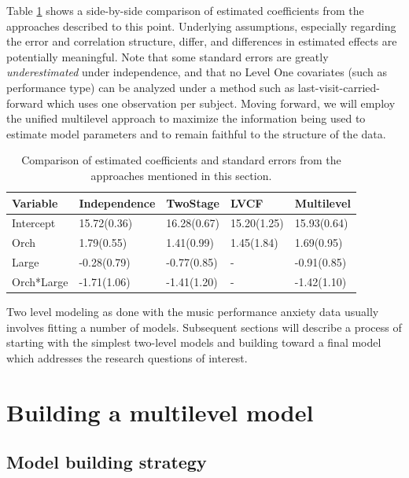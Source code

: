\documentclass[
]{krantz}
\begin{document}
Table \ref{tab:table3chp8} shows a side-by-side comparison of estimated coefficients from the approaches described to this point. Underlying assumptions, especially regarding the error and correlation structure, differ, and differences in estimated effects are potentially meaningful. Note that some standard errors are greatly \emph{underestimated} under independence, and that no Level One covariates (such as performance type) can be analyzed under a method such as last-visit-carried-forward which uses one observation per subject. Moving forward, we will employ the unified multilevel approach to maximize the information being used to estimate model parameters and to remain faithful to the structure of the data.

\begin{table}[t]

\caption{\label{tab:table3chp8}Comparison of estimated coefficients and standard errors from the approaches mentioned in this section.}
\centering
\begin{tabular}{lllll}
\toprule
Variable & Independence & TwoStage & LVCF & Multilevel\\
\midrule
Intercept & 15.72(0.36) & 16.28(0.67) & 15.20(1.25) & 15.93(0.64)\\
Orch & 1.79(0.55) & 1.41(0.99) & 1.45(1.84) & 1.69(0.95)\\
Large & -0.28(0.79) & -0.77(0.85) & - & -0.91(0.85)\\
Orch*Large & -1.71(1.06) & -1.41(1.20) & - & -1.42(1.10)\\
\bottomrule
\end{tabular}
\end{table}

Two level modeling as done with the music performance anxiety data usually involves fitting a number of models. Subsequent sections will describe a process of starting with the simplest two-level models and building toward a final model which addresses the research questions of interest.

\hypertarget{sec:buildmodel}{%
\section{Building a multilevel model}\label{sec:buildmodel}}

\hypertarget{buildstrategy}{%
\subsection{Model building strategy}\label{buildstrategy}}
\end{document}
